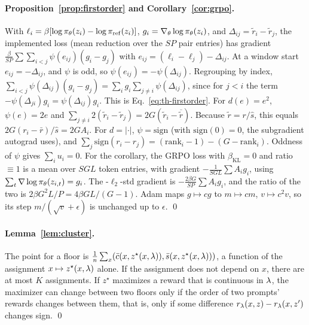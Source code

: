 \paragraph{Proposition~\ref{prop:firstorder} and Corollary~\ref{cor:grpo}.}
With $\ell_i = \beta[\log\pi_\theta(z_i) - \log\pi_{\mathrm{ref}}(z_i)]$,
$g_i = \nabla_\theta\log\pi_\theta(z_i)$, and $\Delta_{ij} = \tilde r_i - \tilde r_j$,
the implemented loss (mean reduction over the $SP$ pair entries) has gradient
$\frac{\beta}{SP}\sum\sum_{i<j}\psi(e_{ij})(g_i - g_j)$ with
$e_{ij} = (\ell_i - \ell_j) - \Delta_{ij}$. At a window start
$e_{ij} = -\Delta_{ij}$, and $\psi$ is odd, so $\psi(e_{ij}) = -\psi(\Delta_{ij})$.
Regrouping by index,
$\sum_{i<j}\psi(\Delta_{ij})(g_i - g_j) = \sum_i g_i\sum_{j\ne i}\psi(\Delta_{ij})$,
since for $j < i$ the term $-\psi(\Delta_{ji})g_i = \psi(\Delta_{ij})g_i$. This
is Eq.~\eqref{eq:th-firstorder}.
For $d(e) = e^2$, $\psi(e) = 2e$ and
$\sum_{j\ne i}2(\tilde r_i - \tilde r_j) = 2G(\tilde r_i - \overline{\tilde r})$.
Because $\tilde r = r/\hat s$, this equals $2G(r_i - \bar r)/\hat s = 2GA_i$.
For $d = |\cdot|$, $\psi = \mathrm{sign}$ (with $\mathrm{sign}(0) = 0$, the
subgradient autograd uses), and
$\sum_j \mathrm{sign}(r_i - r_j) = (\mathrm{rank}_i - 1) - (G - \mathrm{rank}_i)$.
Oddness of $\psi$ gives $\sum_i u_i = 0$.
For the corollary, the GRPO loss with $\beta_{\mathrm{KL}}=0$ and ratio $\equiv 1$
is a mean over $SGL$ token entries, with gradient
$-\frac{1}{SGL}\sum A_i g_i$, using $\sum_t \nabla\log\pi_\theta(z_{i,t}) = g_i$.
The \rrebel{}-$\ell_2$-std gradient is $-\frac{2\beta G}{SP}\sum A_i g_i$, and
the ratio of the two is $2\beta G^2L/P = 4\beta GL/(G-1)$. Adam maps
$g \mapsto cg$ to $m\mapsto cm$, $v\mapsto c^2v$, so its step
$m/(\sqrt v + \epsilon)$ is unchanged up to $\epsilon$. \qed

\paragraph{Lemma~\ref{lem:cluster}.}
The point for a floor is $\frac1n\sum_x(\bar c(x,z^\star(x,\lambda)),
\bar s(x,z^\star(x,\lambda)))$, a function of the assignment
$x \mapsto z^\star(x,\lambda)$ alone. If the assignment does not depend on $x$,
there are at most $K$ assignments. If $z^\star$ maximizes a reward that is
continuous in $\lambda$, the maximizer can change between two floors only if the
order of two prompts' rewards changes between them, that is, only if some
difference $r_\lambda(x,z) - r_\lambda(x,z')$ changes sign. \qed

